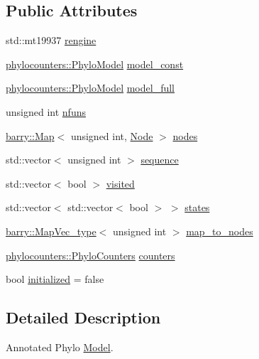 \subsection*{Public Attributes}
\begin{DoxyCompactItemize}
\item 
std\+::mt19937 \hyperlink{class_a_phylo_model_a3f7a406330ca376840dcea3324e69448}{rengine}
\item 
\hyperlink{namespacebarry_1_1counters_1_1phylo_ad32b4186e3bab93119df225fddc3c609}{phylocounters\+::\+Phylo\+Model} \hyperlink{class_a_phylo_model_ad91e946cad1e96aa444b586921d1ebe6}{model\+\_\+const}
\item 
\hyperlink{namespacebarry_1_1counters_1_1phylo_ad32b4186e3bab93119df225fddc3c609}{phylocounters\+::\+Phylo\+Model} \hyperlink{class_a_phylo_model_a79c9e748c657487a60497265348f8a14}{model\+\_\+full}
\item 
unsigned int \hyperlink{class_a_phylo_model_a1abbdd05ac20bf7f0bdb0366190198a1}{nfuns}
\item 
\hyperlink{namespacebarry_a979a04835a9855ff2054c383c569c89e}{barry\+::\+Map}$<$ unsigned int, \hyperlink{class_node}{Node} $>$ \hyperlink{class_a_phylo_model_af48d7223972ea6f74d2780b316db730e}{nodes}
\item 
std\+::vector$<$ unsigned int $>$ \hyperlink{class_a_phylo_model_a5f15ec301385244387c9be5290f5ee28}{sequence}
\item 
std\+::vector$<$ bool $>$ \hyperlink{class_a_phylo_model_ac98b6767ff0c32b30caf23dbf6810578}{visited}
\item 
std\+::vector$<$ std\+::vector$<$ bool $>$ $>$ \hyperlink{class_a_phylo_model_aa6a0a51491c065588bb3504d9b84540c}{states}
\item 
\hyperlink{namespacebarry_a2f0d3aab1d67e4c8eaeab9022e16139f}{barry\+::\+Map\+Vec\+\_\+type}$<$ unsigned int $>$ \hyperlink{class_a_phylo_model_ae041cf2aa3630fab0a050e176c9317f9}{map\+\_\+to\+\_\+nodes}
\item 
\hyperlink{namespacebarry_1_1counters_1_1phylo_a4e401ffe66d04091343dcffaf915f8c3}{phylocounters\+::\+Phylo\+Counters} \hyperlink{class_a_phylo_model_ac301d6887933072072bdf3472df5c8a3}{counters}
\item 
bool \hyperlink{class_a_phylo_model_a298c38ef857994159589a6c0f7578150}{initialized} = false
\end{DoxyCompactItemize}


\subsection{Detailed Description}
Annotated Phylo \hyperlink{class_model}{Model}. 

